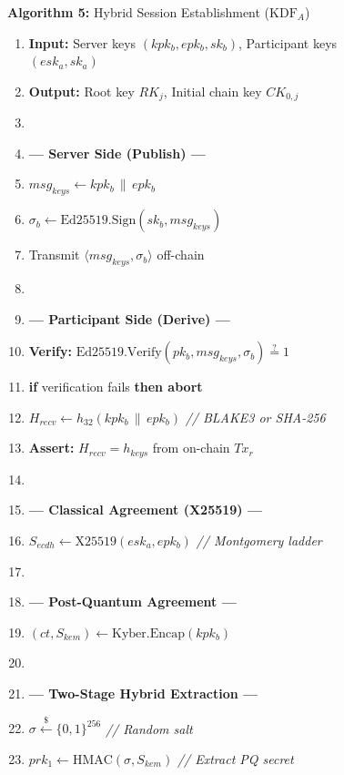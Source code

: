 \documentclass[journal, 10pt, twocolumn]{IEEEtran}
\begin{document}
\begin{figure}[!t]
\hrulefill
\vspace{-0.2cm}
\begin{center}
\textbf{Algorithm 5:} Hybrid Session Establishment ($\text{KDF}_A$)
\end{center}
\vspace{-0.2cm}
\hrulefill
\begin{enumerate}
    \item \textbf{Input:} Server keys $(kpk_b, epk_b, sk_b)$, Participant keys $(esk_a, sk_a)$
    \item \textbf{Output:} Root key $RK_j$, Initial chain key $CK_{0,j}$
    \item[]
    \item[] \textbf{--- Server Side (Publish) ---}
    \item $msg_{keys} \leftarrow kpk_b \,\|\, epk_b$
    \item $\sigma_b \leftarrow \text{Ed25519.Sign}(sk_b, msg_{keys})$
    \item Transmit $\langle msg_{keys}, \sigma_b \rangle$ off-chain
    \item[]
    \item[] \textbf{--- Participant Side (Derive) ---}
    \item \textbf{Verify:} $\text{Ed25519.Verify}(pk_b, msg_{keys}, \sigma_b) \stackrel{?}{=} 1$
    \item \textbf{if} verification fails \textbf{then abort}
    \item $H_{recv} \leftarrow h_{32}(kpk_b \,\|\, epk_b)$ \quad \textit{// BLAKE3 or SHA-256}
    \item \textbf{Assert:} $H_{recv} = h_{keys}$ from on-chain $Tx_r$
    \item[]
    \item[] \textbf{--- Classical Agreement (X25519) ---}
    \item $S_{ecdh} \leftarrow \text{X25519}(esk_a, epk_b)$ \quad \textit{// Montgomery ladder}
    \item[]
    \item[] \textbf{--- Post-Quantum Agreement ---}
    \item $(ct, S_{kem}) \leftarrow \text{Kyber.Encap}(kpk_b)$
    \item[]
    \item[] \textbf{--- Two-Stage Hybrid Extraction ---}
    \item $\sigma \xleftarrow{\$} \{0,1\}^{256}$ \quad \textit{// Random salt}
    \item $prk_1 \leftarrow \text{HMAC}(\sigma, S_{kem})$ \quad \textit{// Extract PQ secret}

\end{enumerate}
\end{figure}
\end{document}
